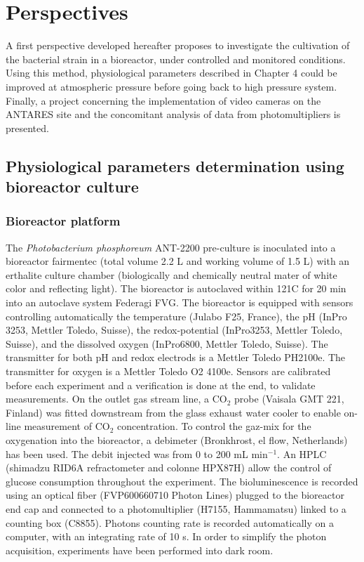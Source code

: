 \section{Perspectives}

A first perspective developed hereafter proposes to investigate the cultivation of the bacterial strain in a bioreactor, under controlled and monitored conditions. Using this method, physiological parameters described in Chapter 4 could be improved at atmospheric pressure before going back to high pressure system. Finally, a project concerning the implementation of video cameras on the ANTARES site and the concomitant analysis of data from photomultipliers is presented.\\

\subsection[Physiological parameters determination using bioreactor culture]{Physiological parameters determination using bioreactor culture
}
\label{bioreactor}
\subsubsection*{Bioreactor platform}

The \textit{Photobacterium phosphoreum} ANT-2200 pre-culture is inoculated into a bioreactor fairmentec (total volume 2.2 L and working volume of 1.5 L) with an erthalite culture chamber (biologically and chemically neutral mater of white color and reflecting light). The bioreactor is autoclaved within 121\degres C for 20 min into an autoclave system Federagi FVG. The bioreactor is equipped with sensors controlling automatically the temperature (Julabo F25, France), the pH (InPro 3253, Mettler Toledo, Suisse), the redox-potential (InPro3253, Mettler Toledo, Suisse), and the dissolved oxygen (InPro6800, Mettler Toledo, Suisse). The transmitter for both pH and redox electrods is a Mettler Toledo PH2100e. The transmitter for oxygen is a Mettler Toledo O2 4100e. Sensors are calibrated before each experiment and a verification is done at the end, to validate measurements. On the outlet gas stream line, a CO$_2$ probe (Vaisala GMT 221, Finland) was fitted downstream from the glass exhaust water cooler to enable on-line measurement of CO$_2$ concentration. To control the gaz-mix for the oxygenation into the bioreactor, a debimeter (Bronkhrost, el flow, Netherlands) has been used. The debit injected was from 0 to 200 mL min$^{-1}$. An HPLC (shimadzu RID6A refractometer and colonne HPX87H) allow the control of glucose consumption throughout the experiment. The bioluminescence is recorded using an optical fiber (FVP600660710 Photon Lines) plugged to the bioreactor end cap and connected to a photomultiplier (H7155, Hammamatsu) linked to a counting box (C8855). Photons counting rate is recorded automatically on a computer, with an integrating rate of 10 s. In order to simplify the photon acquisition, experiments have been performed into dark room.\\

